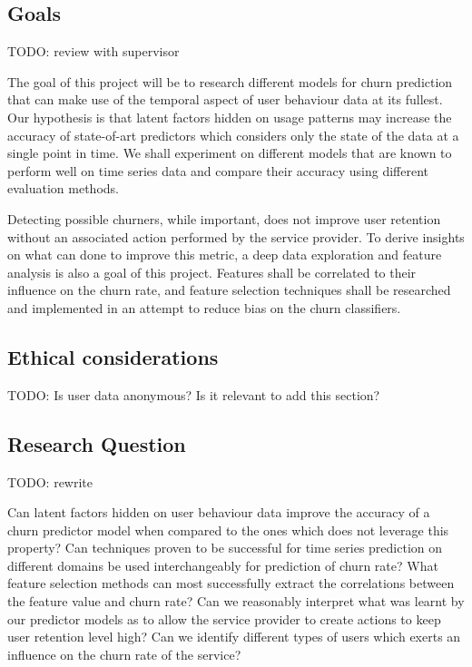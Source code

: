 \documentclass{kththesis}
\begin{document}
	\subsection{Goals}	
	
	TODO: review with supervisor
	
The goal of this project will be to research different models for churn prediction that can make use of the temporal aspect of user behaviour data at its fullest. Our hypothesis is that latent factors hidden on usage patterns may increase the accuracy of state-of-art predictors which considers only the state of the data at a single point in time. We shall experiment on different models that are known to perform well on time series data and compare their accuracy using different evaluation methods. 

Detecting possible churners, while important, does not improve user retention without an associated action performed by the service provider. To derive insights on what can done to improve this metric, a deep data exploration and feature analysis is also a goal of this project. Features shall be correlated to their influence on the churn rate, and feature selection techniques shall be researched and implemented in an attempt to reduce bias on the churn classifiers.
	
	\subsection{Ethical considerations}   
    
	TODO: Is user data anonymous? Is it relevant to add this section?

\subsection{Research Question}
        
    TODO: rewrite    
        
	Can latent factors hidden on user behaviour data improve the accuracy of a churn predictor model when compared to the ones which does not leverage this property? Can techniques proven to be successful for time series prediction on different domains be used interchangeably for prediction of churn rate? What feature selection methods can most successfully extract the correlations between the feature value and churn rate? Can we reasonably interpret what was learnt by our predictor models as to allow the service provider to create actions to keep user retention level high? Can we identify different types of users which exerts an influence on the churn rate of the service?
\end{document}
